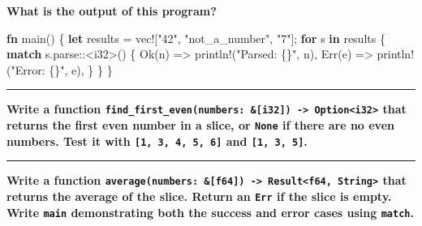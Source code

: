 \documentclass[
  11pt,
]{article}
\newenvironment{Shaded}{}{}
\newcommand{\ConstantTok}[1]{\textcolor[rgb]{0.53,0.00,0.00}{#1}}
\newcommand{\ControlFlowTok}[1]{\textcolor[rgb]{0.00,0.44,0.13}{\textbf{#1}}}
\newcommand{\DataTypeTok}[1]{\textcolor[rgb]{0.56,0.13,0.00}{#1}}
\newcommand{\KeywordTok}[1]{\textcolor[rgb]{0.00,0.44,0.13}{\textbf{#1}}}
\newcommand{\NormalTok}[1]{#1}
\newcommand{\OperatorTok}[1]{\textcolor[rgb]{0.40,0.40,0.40}{#1}}
\newcommand{\PreprocessorTok}[1]{\textcolor[rgb]{0.74,0.48,0.00}{#1}}
\newcommand{\StringTok}[1]{\textcolor[rgb]{0.25,0.44,0.63}{#1}}
\begin{document}
\textbf{What is the output of this program?}

\begin{Shaded}
\begin{Highlighting}[]
\KeywordTok{fn}\NormalTok{ main() }\OperatorTok{\{}
    \KeywordTok{let}\NormalTok{ results }\OperatorTok{=} \PreprocessorTok{vec!}\NormalTok{[}\StringTok{"42"}\OperatorTok{,} \StringTok{"not\_a\_number"}\OperatorTok{,} \StringTok{"7"}\NormalTok{]}\OperatorTok{;}
    \ControlFlowTok{for}\NormalTok{ s }\KeywordTok{in}\NormalTok{ results }\OperatorTok{\{}
        \ControlFlowTok{match}\NormalTok{ s}\OperatorTok{.}\PreprocessorTok{parse::}\OperatorTok{\textless{}}\DataTypeTok{i32}\OperatorTok{\textgreater{}}\NormalTok{() }\OperatorTok{\{}
            \ConstantTok{Ok}\NormalTok{(n) }\OperatorTok{=\textgreater{}} \PreprocessorTok{println!}\NormalTok{(}\StringTok{"Parsed: \{\}"}\OperatorTok{,}\NormalTok{ n)}\OperatorTok{,}
            \ConstantTok{Err}\NormalTok{(e) }\OperatorTok{=\textgreater{}} \PreprocessorTok{println!}\NormalTok{(}\StringTok{"Error: \{\}"}\OperatorTok{,}\NormalTok{ e)}\OperatorTok{,}
        \OperatorTok{\}}
    \OperatorTok{\}}
\OperatorTok{\}}
\end{Highlighting}
\end{Shaded}

\begin{center}\rule{0.5\linewidth}{0.5pt}\end{center}

\textbf{Write a function
\texttt{find\_first\_even(numbers:\ \&{[}i32{]})\ -\textgreater{}\ Option\textless{}i32\textgreater{}}
that returns the first even number in a slice, or \texttt{None} if there
are no even numbers. Test it with \texttt{{[}1,\ 3,\ 4,\ 5,\ 6{]}} and
\texttt{{[}1,\ 3,\ 5{]}}.}

\begin{Shaded}
\begin{Highlighting}[]

\end{Highlighting}
\end{Shaded}

\begin{center}\rule{0.5\linewidth}{0.5pt}\end{center}

\textbf{Write a function
\texttt{average(numbers:\ \&{[}f64{]})\ -\textgreater{}\ Result\textless{}f64,\ String\textgreater{}}
that returns the average of the slice. Return an \texttt{Err} if the
slice is empty. Write \texttt{main} demonstrating both the success and
error cases using \texttt{match}.}
\end{document}
